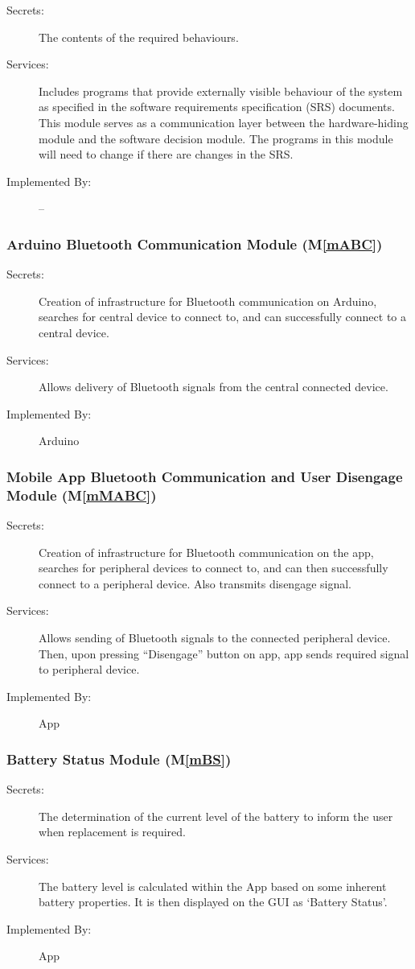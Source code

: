 \documentclass[12pt, titlepage]{article}
\newcommand{\mref}[1]{M\ref{#1}}
\begin{document}
\begin{description}
\item[Secrets:]The contents of the required behaviours.
\item[Services:]Includes programs that provide externally visible behaviour of
  the system as specified in the software requirements specification (SRS)
  documents. This module serves as a communication layer between the
  hardware-hiding module and the software decision module. The programs in this
  module will need to change if there are changes in the SRS.
\item[Implemented By:] --
\end{description}


\subsubsection{Arduino Bluetooth Communication Module (\mref{mABC})}
\begin{description}
\item[Secrets:]Creation of infrastructure for Bluetooth communication on Arduino, searches for central device to connect to, and can successfully connect to a central device.
\item[Services:]Allows delivery of Bluetooth signals from the central connected device. 
\item[Implemented By:] Arduino
\end{description}

\subsubsection{Mobile App Bluetooth Communication and User Disengage Module (\mref{mMABC})}
\begin{description}
\item[Secrets:]Creation of infrastructure for Bluetooth communication on the app, searches for peripheral devices to connect to, and can then successfully connect to a peripheral device. Also transmits disengage signal.
\item[Services:]Allows sending of Bluetooth signals to the connected peripheral device. Then, upon pressing “Disengage” button on app, app sends required signal to peripheral device.
\item[Implemented By:] App
\end{description}

\subsubsection{Battery Status Module (\mref{mBS})}
\begin{description}
\item[Secrets:]The determination of the current level of the battery to inform the user when replacement is required.
\item[Services:]The battery level is calculated within the App based on some inherent battery properties. It is then displayed on the GUI as ‘Battery Status’. 
\item[Implemented By:]App
\end{description}
\end{document}
